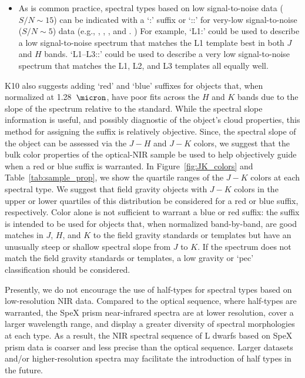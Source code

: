 \documentclass[12pt,preprint]{aastex}
\begin{document}
\begin{itemize}
	\item As is common practice, spectral types based on low signal-to-noise data ($S/N\sim15$) can be indicated with a `:' suffix or `::' for very-low signal-to-noise ($S/N\sim5$) data (e.g., \citet{Sanduleak:1988fn}, \cite{Silvestri:2006el}, \cite[Table 12.1]{Gray:2009wd}, and \cite{Covey:2010de}. ) For example, `L1:' could be used to describe a low signal-to-noise spectrum that matches the L1 template best in both $J$ and $H$ bands. `L1--L3::' could be used to describe a very low signal-to-noise spectrum that matches the L1, L2, and L3 templates all equally well. %

\end{itemize}	

K10 also suggests adding `red' and `blue' suffixes for objects that, when normalized at 1.28~$\micron$, have poor fits across the $H$ and $K$ bands due to the slope of the spectrum relative to the standard. 
While the spectral slope information is useful, and possibly diagnostic of the object's cloud properties, this method for assigning the suffix is relatively objective.
Since, the spectral slope of the object can be assessed via the $J-H$ and $J-K$ colors, we suggest that the bulk color properties of the optical-NIR sample be used to help objectively guide when a red or blue suffix is warranted.
In Figure~\ref{fig:JK_colors} and Table~\ref{tab:sample_prop}, we show the quartile ranges of the $J-K$ colors at each spectral type. 
We suggest that field gravity objects with $J-K$ colors in the upper or lower quartiles of this distribution be considered for a red or blue suffix, respectively. 
Color alone is not sufficient to warrant a blue or red suffix: the suffix is intended to be used for objects that, when normalized band-by-band, are good matches in $J$, $H$, and $K$ to the field gravity standards or templates but have an unusually steep or shallow spectral slope from $J$ to $K$.
If the spectrum does not match the field gravity standards or templates, a low gravity or `pec' classification should be considered.

Presently, we do not encourage the use of half-types for spectral types based on low-resolution NIR data. 
Compared to the optical sequence, where half-types are warranted, the SpeX prism near-infrared spectra are at lower resolution, cover a larger wavelength range, and display a greater diversity of spectral morphologies at each type. 
As a result, the NIR spectral sequence of L dwarfs based on SpeX prism data is coarser and less precise than the optical sequence.
Larger datasets and/or higher-resolution spectra may facilitate the introduction of half types in the future.
\end{document}
